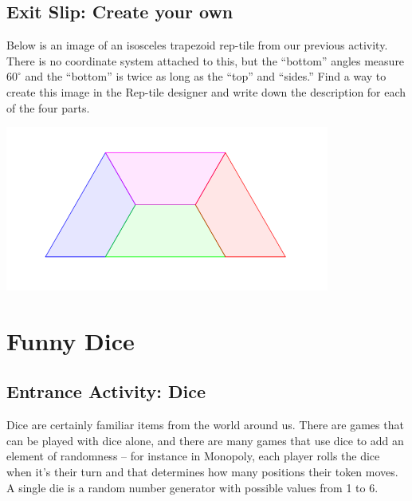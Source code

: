 \wbnewpage

\subsection{Exit Slip: Create your own}

Below is an image of an isosceles trapezoid rep-tile from our previous activity. There is no coordinate system attached to this, but the ``bottom'' angles measure $60^{\circ}$ and the ``bottom'' is twice as long as the ``top'' and ``sides.'' Find a way to create this image in the Rep-tile designer and write down the description for each of the four parts.

\begin{center}
        \includegraphics[width=4.2in]{images/Trap-Reptile}
    \end{center}

\newpage


\section{Funny Dice}\label{sec:FunnyDice}

\subsection{Entrance Activity: Dice}


Dice are certainly familiar items from the world around us.  There are games that can be played with dice alone, and there are many games that use dice to add an element of randomness -- for instance in Monopoly, each player rolls the dice when it's their turn and that determines how many positions their token moves.  A single die is a random number generator with possible values from 1 to 6.

